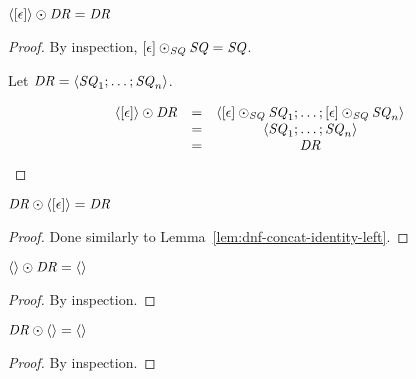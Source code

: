 \documentclass[numbers,10pt,preprint\ifanon ,nocopyrightspace\fi]{sigplanconf}
\begin{document}
\begin{lemma}
  \label{lem:dnf-concat-identity-left}
  $\langle[\epsilon]\rangle \odot \mathit{DR} = \mathit{DR}$
\end{lemma}
\begin{proof}
  By inspection,
  $[\epsilon] \odot_{\mathit{SQ}} \mathit{SQ} = \mathit{SQ}$.

  Let $\mathit{DR} = \langle\mathit{SQ}_1;\ldots;\mathit{SQ}_n\rangle$.

  \[
    \begin{array}{ccc}
      \langle[\epsilon]\rangle \odot \mathit{DR}
      & = & \langle[\epsilon]\odot_{\mathit{SQ}}\mathit{SQ}_1;
            \ldots;[\epsilon]\odot_{\mathit{SQ}}\mathit{SQ}_n\rangle\\
      & = & \langle\mathit{SQ}_1;\ldots;\mathit{SQ}_n\rangle\\
      & = & \mathit{DR}
    \end{array}
  \]
\end{proof}

\begin{lemma}
  \label{lem:dnf-concat-identity-right}
  $\mathit{DR} \odot \langle[\epsilon]\rangle = \mathit{DR}$
\end{lemma}
\begin{proof}
  Done similarly to Lemma~\ref{lem:dnf-concat-identity-left}.
\end{proof}

\begin{lemma}
  \label{lem:dnf-concat-projection-left}
  $\langle\rangle \odot \mathit{DR} = \langle\rangle$
\end{lemma}
\begin{proof}
  By inspection.
\end{proof}

\begin{lemma}
  \label{lem:dnf-concat-projection-right}
  $\mathit{DR} \odot \langle\rangle = \langle\rangle$
\end{lemma}
\begin{proof}
  By inspection.
\end{proof}
\end{document}

